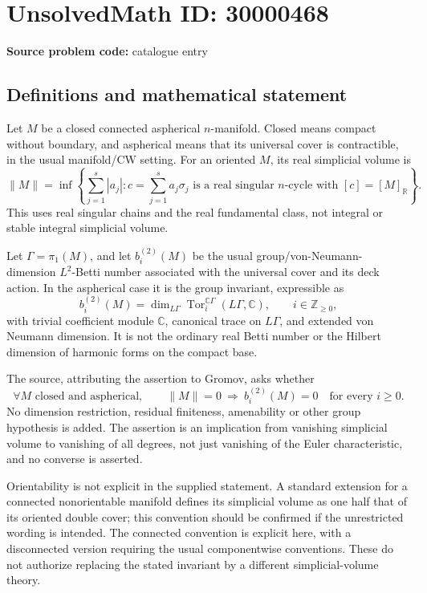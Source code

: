 \documentclass[11pt]{article}
\newcommand{\Z}{\mathbb{Z}}
\newcommand{\R}{\mathbb{R}}
\newcommand{\C}{\mathbb{C}}
\begin{document}
\section*{UnsolvedMath ID: 30000468}
\textbf{Source problem code:} catalogue entry
\subsection{Definitions and mathematical statement}
Let \(M\) be a closed connected aspherical \(n\)-manifold. Closed means compact without boundary, and aspherical means that its universal cover is contractible, in the usual manifold/CW setting. For an oriented \(M\), its real simplicial volume is
\[
 \|M\|=\inf\left\{\sum_{j=1}^s|a_j|:
 c=\sum_{j=1}^s a_j\sigma_j\text{ is a real singular }n\text{-cycle with }[c]=[M]_{\R}\right\}.
\]
This uses real singular chains and the real fundamental class, not integral or stable integral simplicial volume.

Let \(\Gamma=\pi_1(M)\), and let \(b_i^{(2)}(M)\) be the usual group/von-Neumann-dimension \(L^2\)-Betti number associated with the universal cover and its deck action. In the aspherical case it is the group invariant, expressible as
\[
 b_i^{(2)}(M)=\dim_{L\Gamma}\operatorname{Tor}^{\C\Gamma}_i(L\Gamma,\C),
 \qquad i\in\Z_{\geq0},
\]
with trivial coefficient module \(\C\), canonical trace on \(L\Gamma\), and extended von Neumann dimension. It is not the ordinary real Betti number or the Hilbert dimension of harmonic forms on the compact base.

The source, attributing the assertion to Gromov, asks whether
\[
 \forall M\text{ closed and aspherical},\qquad
 \|M\|=0\ \Longrightarrow\ b_i^{(2)}(M)=0
 \quad\text{for every }i\geq0.
\]
No dimension restriction, residual finiteness, amenability or other group hypothesis is added. The assertion is an implication from vanishing simplicial volume to vanishing of all degrees, not just vanishing of the Euler characteristic, and no converse is asserted.

Orientability is not explicit in the supplied statement. A standard extension for a connected nonorientable manifold defines its simplicial volume as one half that of its oriented double cover; this convention should be confirmed if the unrestricted wording is intended. The connected convention is explicit here, with a disconnected version requiring the usual componentwise conventions. These do not authorize replacing the stated invariant by a different simplicial-volume theory.
\end{document}
